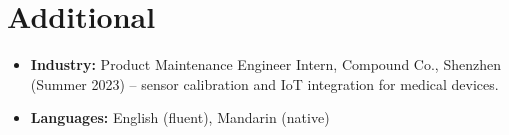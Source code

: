 \documentclass[11pt, letterpaper]{article}
\begin{document}
\section{Additional}
\begin{itemize}
    \item \textbf{Industry:} Product Maintenance Engineer Intern, Compound Co., Shenzhen (Summer 2023) -- sensor calibration and IoT integration for medical devices.
    \item \textbf{Languages:} English (fluent), Mandarin (native)
\end{itemize}
\end{document}
